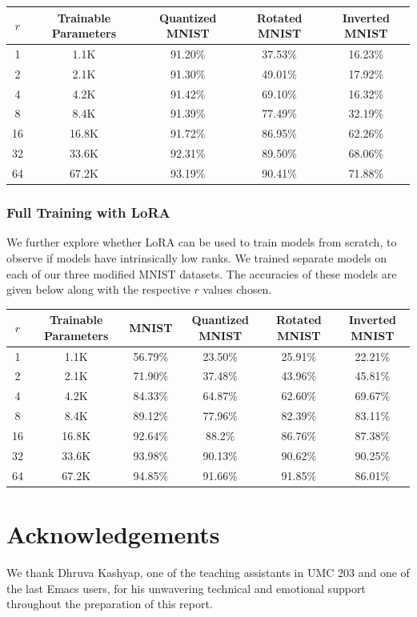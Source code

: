 \documentclass{article}
\newcommand\Tstrut{\rule{0pt}{2.6ex}}
\begin{document}
\begin{center}
    \begin{tabular}{c | c | c | c | c}
        $r$ & Trainable Parameters & Quantized MNIST & Rotated MNIST & Inverted MNIST \\
        \hline
        1 & 1.1K & 91.20\% & 37.53\% & 16.23\% \Tstrut \\
        2 & 2.1K & 91.30\% & 49.01\% & 17.92\% \\
        4 & 4.2K & 91.42\% & 69.10\% & 16.32\% \\
        8 & 8.4K & 91.39\% & 77.49\% & 32.19\% \\
        16 & 16.8K & 91.72\% & 86.95\% & 62.26\% \\
        32 & 33.6K & 92.31\% & 89.50\% & 68.06\% \\
        64 & 67.2K & 93.19\% & 90.41\% & 71.88\%
    \end{tabular}
\end{center}

\subsubsection{Full Training with LoRA}
We further explore whether LoRA can be used to train models from scratch, to observe if models have intrinsically low ranks. We trained separate models on each of our three modified MNIST datasets. The accuracies of these models are given below along with the respective $r$ values chosen.

\begin{center}
    \begin{tabular}{c | c | c | c | c | c}
        $r$ & Trainable Parameters & MNIST & Quantized MNIST & Rotated MNIST & Inverted MNIST \\
        \hline
        1 & 1.1K & 56.79\% & 23.50\% & 25.91\% & 22.21\% \Tstrut \\
        2 & 2.1K & 71.90\% & 37.48\% & 43.96\% & 45.81\% \\
        4 & 4.2K & 84.33\% & 64.87\% & 62.60\% & 69.67\% \\
        8 & 8.4K & 89.12\% & 77.96\% & 82.39\% & 83.11\% \\
        16 & 16.8K & 92.64\% & 88.2\% & 86.76\% & 87.38\% \\
        32 & 33.6K & 93.98\% & 90.13\% & 90.62\% & 90.25\% \\
        64 & 67.2K & 94.85\% & 91.66\% & 91.85\% & 86.01\%
    \end{tabular}
\end{center}

\section{Acknowledgements}
We thank Dhruva Kashyap, one of the teaching assistants in UMC 203 and one of the last Emacs users, for his unwavering technical and emotional support throughout the preparation of this report.

\end{document}
